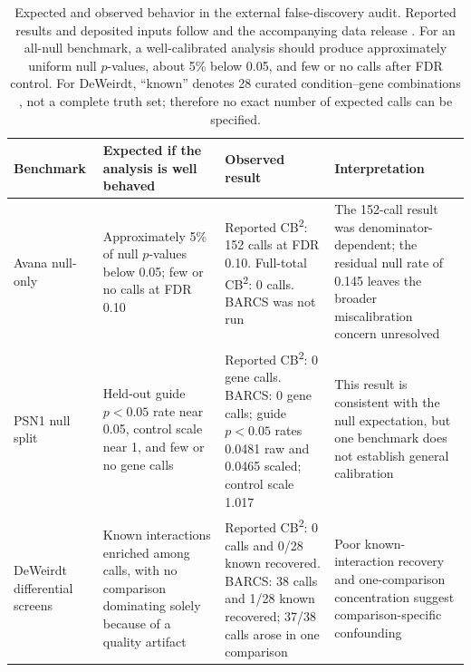 \begin{table}[htbp]
\centering
\caption{Expected and observed behavior in the external false-discovery audit.
Reported results and deposited inputs follow \citet{dempster2025fdr} and the
accompanying data release \citep{dempster2025fdrdata}.  For an all-null
benchmark, a well-calibrated analysis should produce approximately uniform
null $p$-values, about 5\% below 0.05, and few or no calls after FDR control.
For DeWeirdt, ``known'' denotes 28 curated condition--gene combinations
\citep{deweirdt2020isogenic}, not a complete truth set; therefore no exact
number of expected calls can be specified.}
\label{tab:chronosaudit}
\footnotesize
\setlength{\tabcolsep}{3pt}
\renewcommand{\arraystretch}{1.10}
\begin{tabular}{>{\raggedright\arraybackslash}p{}
                >{\raggedright\arraybackslash}p{}
                >{\raggedright\arraybackslash}p{}
                >{\raggedright\arraybackslash}p{}}
\toprule
Benchmark & Expected if the analysis is well behaved & Observed result &
Interpretation\\
\midrule
Avana null-only &
Approximately 5\% of null $p$-values below 0.05; few or no calls at FDR 0.10 &
Reported CB\textsuperscript{2}: 152 calls at FDR 0.10.  Full-total
CB\textsuperscript{2}: 0 calls.  BARCS was not run &
The 152-call result was denominator-dependent; the residual null rate of 0.145
leaves the broader miscalibration concern unresolved\\
\addlinespace[2pt]
PSN1 null split &
Held-out guide $p<0.05$ rate near 0.05, control scale near 1, and few or no
gene calls &
Reported CB\textsuperscript{2}: 0 gene calls.  BARCS: 0 gene calls; guide
$p<0.05$ rates 0.0481 raw and 0.0465 scaled; control scale 1.017 &
This result is consistent with the null expectation, but one benchmark does
not establish general calibration\\
\addlinespace[2pt]
DeWeirdt differential screens &
Known interactions enriched among calls, with no comparison dominating solely
because of a quality artifact &
Reported CB\textsuperscript{2}: 0 calls and 0/28 known recovered.  BARCS: 38
calls and 1/28 known recovered; 37/38 calls arose in one comparison &
Poor known-interaction recovery and one-comparison concentration suggest
comparison-specific confounding\\
\bottomrule
\end{tabular}
\end{table}

